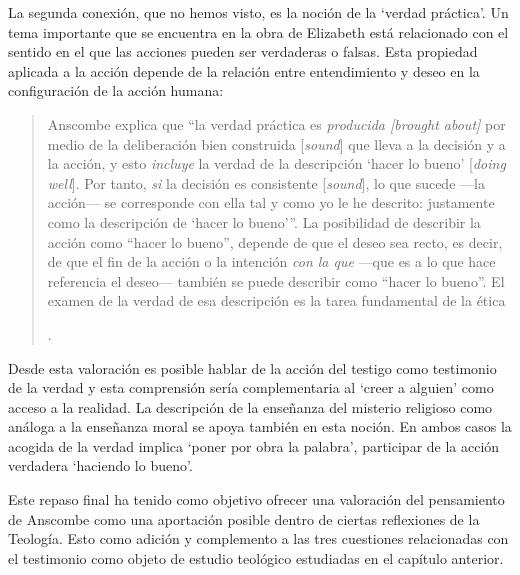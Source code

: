 La segunda conexión, que no hemos visto, es la noción de la `verdad práctica'. Un tema importante que se encuentra en la obra de Elizabeth está relacionado con el sentido en el que las acciones pueden ser verdaderas o falsas. Esta propiedad aplicada a la acción depende de la relación entre entendimiento y deseo en la configuración de la acción humana: \blockquote[{\Cite[189]{torralba2005accion}}.]{Anscombe explica que ``la verdad práctica es \emph{producida [brought about]} por medio de la deliberación bien construida [\emph{sound}] que lleva a la decisión y a la acción, y esto \emph{incluye} la verdad de la descripción `hacer lo bueno' [\emph{doing well}]. Por tanto, \emph{si} la decisión es consistente [\emph{sound}], lo que sucede ---la acción--- se corresponde con ella tal y como yo le he descrito: justamente como la descripción de `hacer lo bueno'''. La posibilidad de describir la acción como ``hacer lo bueno'', depende de que el deseo sea recto, es decir, de que el fin de la acción o la intención \emph{con la que} ---que es a lo que hace referencia el deseo--- también se puede describir como ``hacer lo bueno''. El examen de la verdad de esa descripción es la tarea fundamental de la ética}. Desde esta valoración es posible hablar de la acción del testigo como testimonio de la verdad y esta comprensión sería complementaria al `creer a alguien' como acceso a la realidad. La descripción de la enseñanza del misterio religioso como análoga a la enseñanza moral se apoya también en esta noción. En ambos casos la acogida de la verdad implica `poner por obra la palabra', participar de la acción verdadera `haciendo lo bueno'.

Este repaso final ha tenido como objetivo ofrecer una valoración del pensamiento de Anscombe como una aportación posible dentro de ciertas reflexiones de la Teología. Esto como adición y complemento a las tres cuestiones relacionadas con el testimonio como objeto de estudio teológico estudiadas en el capítulo anterior.


